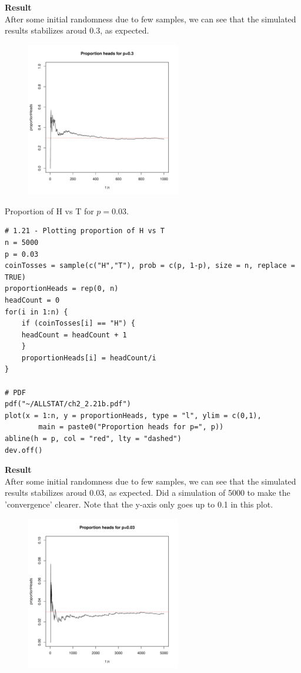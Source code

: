 \medskip\noindent
\textbf{Result}\\
After some initial randomness due to few samples, we can see that the simulated results stabilizes
aroud 0.3, as expected.
\begin{figure}[H]
    \includegraphics[width=0.6\textwidth]{ch2_2.21a.pdf}
\end{figure}


\newpage\noindent
Proportion of H vs T for $p=0.03$.
\begin{lstlisting}[style=RSyntax, title=R]
# 1.21 - Plotting proportion of H vs T
n = 5000
p = 0.03
coinTosses = sample(c("H","T"), prob = c(p, 1-p), size = n, replace = TRUE)
proportionHeads = rep(0, n)
headCount = 0
for(i in 1:n) {
    if (coinTosses[i] == "H") {
    headCount = headCount + 1
    } 
    proportionHeads[i] = headCount/i
} 

# PDF
pdf("~/ALLSTAT/ch2_2.21b.pdf")
plot(x = 1:n, y = proportionHeads, type = "l", ylim = c(0,1),
        main = paste0("Proportion heads for p=", p))
abline(h = p, col = "red", lty = "dashed")
dev.off()        
\end{lstlisting}

\medskip\noindent
\textbf{Result}\\
After some initial randomness due to few samples, we can see that the simulated results stabilizes
aroud 0.03, as expected. Did a simulation of 5000 to make the 'convergence' clearer. Note that the
y-axis only goes up to 0.1 in this plot.
\begin{figure}[H]
    \includegraphics[width=0.6\textwidth]{ch2_2.21b.pdf}
\end{figure}



